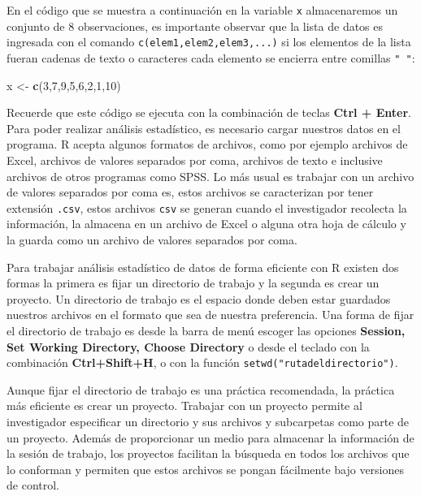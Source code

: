 \documentclass[letterpaper,]{book}
\newenvironment{Shaded}{\begin{snugshade}}{\end{snugshade}}
\newcommand{\DecValTok}[1]{\textcolor[rgb]{0.00,0.00,0.81}{#1}}
\newcommand{\KeywordTok}[1]{\textcolor[rgb]{0.13,0.29,0.53}{\textbf{#1}}}
\newcommand{\NormalTok}[1]{#1}
\newcommand{\StringTok}[1]{\textcolor[rgb]{0.31,0.60,0.02}{#1}}
\begin{document}
En el código que se muestra a continuación en la variable \texttt{x} almacenaremos un conjunto de 8 observaciones, es importante observar que la lista de datos es ingresada con el comando \texttt{c(elem1,elem2,elem3,...)} si los elementos de la lista fueran cadenas de texto o caracteres cada elemento se encierra entre comillas \texttt{"\ "}:

\begin{Shaded}
\begin{Highlighting}[]
\NormalTok{x <-}\StringTok{ }\KeywordTok{c}\NormalTok{(}\DecValTok{3}\NormalTok{,}\DecValTok{7}\NormalTok{,}\DecValTok{9}\NormalTok{,}\DecValTok{5}\NormalTok{,}\DecValTok{6}\NormalTok{,}\DecValTok{2}\NormalTok{,}\DecValTok{1}\NormalTok{,}\DecValTok{10}\NormalTok{) }
\end{Highlighting}
\end{Shaded}

Recuerde que este código se ejecuta con la combinación de teclas \textbf{Ctrl + Enter}. Para poder realizar análisis estadístico, es necesario cargar nuestros datos en el programa. R acepta algunos formatos de archivos, como por ejemplo archivos de Excel, archivos de valores separados por coma, archivos de texto e inclusive archivos de otros programas como SPSS. Lo más usual es trabajar con un archivo de valores separados por coma es, estos archivos se caracterizan por tener extensión \texttt{.csv}, estos archivos \texttt{csv} se generan cuando el investigador recolecta la información, la almacena en un archivo de Excel o alguna otra hoja de cálculo y la guarda como un archivo de valores separados por coma.

Para trabajar análisis estadístico de datos de forma eficiente con R existen dos formas la primera es fijar un directorio de trabajo y la segunda es crear un proyecto. Un directorio de trabajo es el espacio donde deben estar guardados nuestros archivos en el formato que sea de nuestra preferencia. Una forma de fijar el directorio de trabajo es desde la barra de menú escoger las opciones \textbf{Session, Set Working Directory, Choose Directory} o desde el teclado con la combinación \textbf{Ctrl+Shift+H}, o con la función \texttt{setwd("rutadeldirectorio")}.

Aunque fijar el directorio de trabajo es una práctica recomendada, la práctica más eficiente es crear un proyecto. Trabajar con un proyecto permite al investigador especificar un directorio y sus archivos y subcarpetas como parte de un proyecto. Además de proporcionar un medio para almacenar la información de la sesión de trabajo, los proyectos facilitan la búsqueda en todos los archivos que lo conforman y permiten que estos archivos se pongan fácilmente bajo versiones de control.
\end{document}
